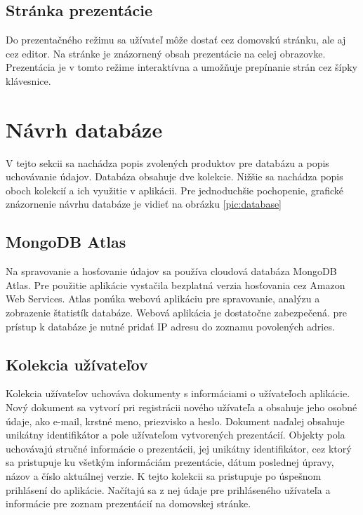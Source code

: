 \subsection*{Stránka prezentácie}
Do prezentačného režimu sa užívateľ môže dostať cez domovskú stránku, ale aj cez editor. Na stránke je znázornený obsah prezentácie na celej obrazovke. Prezentácia je v tomto režime interaktívna a umožňuje prepínanie strán cez šípky klávesnice.

\section{Návrh databáze}
V tejto sekcii sa nachádza popis zvolených produktov pre databázu a popis uchovávanie údajov. Databáza obsahuje dve kolekcie. Nižšie sa nachádza popis oboch kolekcií a ich využitie v aplikácii. Pre jednoduchšie pochopenie, grafické znázornenie návrhu databáze je vidieť na obrázku \ref{pic:database}

\subsection*{MongoDB Atlas}
Na spravovanie a hosťovanie údajov sa používa cloudová databáza MongoDB Atlas. Pre použitie aplikácie vystačila bezplatná verzia hosťovania cez Amazon Web Services. Atlas ponúka webovú aplikáciu pre spravovanie, analýzu a zobrazenie štatistík databáze. Webová aplikácia je dostatočne zabezpečená. pre prístup k databáze je nutné pridať IP adresu do zoznamu povolených adries.  

\subsection*{Kolekcia užívateľov}
Kolekcia užívateľov uchováva dokumenty s informáciami o užívateľoch aplikácie. Nový dokument sa vytvorí pri registrácii nového užívateľa a obsahuje jeho osobné údaje, ako e-mail, krstné meno, priezvisko a heslo. Dokument naďalej obsahuje unikátny identifikátor a pole užívateľom vytvorených prezentácií. Objekty pola uchovávajú stručné informácie o prezentácii, jej unikátny identifikátor, cez ktorý sa pristupuje ku všetkým informáciám prezentácie, dátum poslednej úpravy, názov a číslo aktuálnej verzie. K tejto kolekcii sa pristupuje po úspešnom prihlásení do aplikácie. Načítajú sa z nej údaje pre prihláseného užívateľa a informácie pre zoznam prezentácií na domovskej stránke. 

